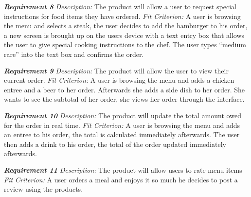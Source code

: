 \documentclass[12pt, titlepage]{article}
\begin{document}
\textbf{\textit{Requirement 8}}\newline
\textit{Description:}\newline
The product will allow a user to request special instructions for food items they have ordered. \newline\newline
\textit{Fit Criterion:}\newline 
A user is browsing the menu and selects a steak, the user decides to add the hamburger to his order, a new screen is brought up on the users device with a text entry box that allows the user to give special cooking instructions to the chef. The user types “medium rare” into the text box and confirms the order.
\newline

\textbf{\textit{Requirement 9}}\newline
\textit{Description:}\newline
The product will allow the user to view their current order. \newline\newline
\textit{Fit Criterion:}\newline 
A user is browsing the menu and adds a chicken entree and a beer to her order. Afterwards she adds a side dish to her order. She wants to see the subtotal of her order, she views her order through the interface.
\newline

\textbf{\textit{Requirement 10}}\newline
\textit{Description:}\newline
The product will update the total amount owed for the order in real time. \newline\newline
\textit{Fit Criterion:}\newline 
A user is browsing the menu and adds an entree to his order, the total is calculated immediately afterwards. The user then adds a drink to his order, the total of the order updated immediately afterwards.
\newline

\textbf{\textit{Requirement 11}}\newline
\textit{Description:}\newline
The product will allow users to rate menu items \newline\newline
\textit{Fit Criterion:}\newline 
A user orders a meal and enjoys it so much he decides to post a review using the products.
\newline
\end{document}
